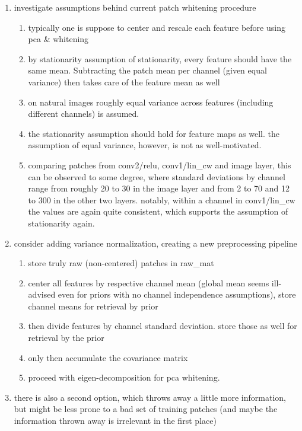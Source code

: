 \documentclass{article}
\begin{document}
\begin{enumerate}
	\item investigate assumptions behind current patch whitening procedure
	\begin{enumerate}
		\item typically one is suppose to center and rescale each feature before using pca \& whitening
		\item by stationarity assumption of stationarity, every feature should have the same mean. Subtracting the patch mean per channel (given equal variance) then takes care of the feature mean as well
		\item on natural images roughly equal variance across features (including different channels) is assumed.
		\item the stationarity assumption should hold for feature maps as well. the assumption of equal variance, however, is not as well-motivated.
		\item comparing patches from conv2/relu, conv1/lin\_cw and image layer, this can be observed to some degree, where standard deviations by channel range from roughly 20 to 30 in the image layer and from 2 to 70 and 12 to 300 in the other two layers. notably, within a channel in conv1/lin\_cw the values are again quite consistent, which supports the assumption of stationarity again.
	\end{enumerate}
	\item consider adding variance normalization, creating a new preprocessing pipeline
	\begin{enumerate}
		\item store truly raw (non-centered) patches in raw\_mat
		\item center all features by respective channel mean (global mean seems ill-advised even for priors with no channel independence assumptions), store 
		channel means for retrieval by prior
		\item then divide features by channel standard deviation. store those as well for retrieval by the prior
		\item only then accumulate the covariance matrix
		\item proceed with eigen-decomposition for pca whitening.
	\end{enumerate}
	\item there is also a second option, which throws away a little more information, but might be less prone to a bad set of training patches (and maybe the information thrown away is irrelevant in the first place)
	\begin{enumerate}

\end{enumerate}
\end{enumerate}
\end{document}
